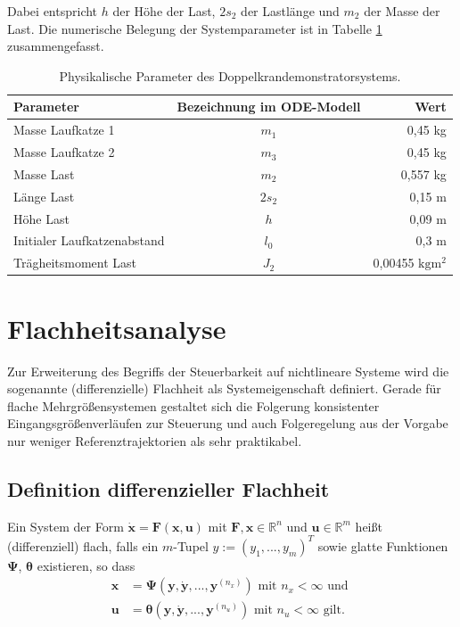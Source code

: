Dabei entspricht $h$ der Höhe der Last, $2 s_2$ der Lastlänge und $m_2$ der Masse der Last. Die numerische Belegung der Systemparameter ist in Tabelle \ref{tab:sys_params} zusammengefasst.

\begin{table}[htbp]%
	\centering
	\caption{Physikalische Parameter des Doppelkrandemonstratorsystems.}
	\label{tab:sys_params}
	\begin{tabular}{l c r} 
		\toprule
		Parameter & Bezeichnung im ODE-Modell & Wert \\ 
		\hline
		Masse Laufkatze 1 & $m_1$ & 0,45 \si{\kg} \\
		Masse Laufkatze 2 & $m_3$ & 0,45 \si{\kg} \\
 		Masse Last & $m_2$ & 0,557 \si{\kg} \\
		Länge Last & $2 s_2$ & 0,15 \si{\m} \\
		Höhe Last & $h$ & 0,09 \si{\m} \\
		Initialer Laufkatzenabstand & $l_0$ & 0,3 \si{\m} \\
		Trägheitsmoment Last & $J_2$ & 0,00455 $\si{\kg\m^2}$ \\
		\bottomrule
	\end{tabular}
\end{table}

\chapter{Flachheitsanalyse}
Zur Erweiterung des Begriffs der Steuerbarkeit auf nichtlineare Systeme wird die sogenannte (differenzielle) Flachheit als Systemeigenschaft definiert. Gerade für flache Mehrgrößensystemen gestaltet sich die Folgerung konsistenter Eingangsgrößenverläufen zur Steuerung und auch Folgeregelung aus der Vorgabe nur weniger Referenztrajektorien als sehr praktikabel.

\section{Definition differenzieller Flachheit}\label{sec:Def_flatness}

Ein System der Form $\dot{\mathbf{x}} = \mathbf{F}(\mathbf{x}, \mathbf{u})$ mit $\mathbf{F}, \mathbf{x} \in \mathbb{R}^n$ und $\mathbf{u} \in \mathbb{R}^m$ heißt (differenziell) flach, falls ein $m$-Tupel $y := (y_1, ..., y_m)^T$ sowie glatte Funktionen $\mathbf{\Psi}$, $\boldsymbol{\theta}$ existieren, so dass
\begin{subequations}
\label{eq:general_flat_sys}
\begin{align}
\mathbf{x} &= \mathbf{\Psi}(\mathbf{y}, \dot{\mathbf{y}}, ..., \mathbf{y}^{(n_x)}) \text{ mit } n_x < \infty \text{ und } \\
\mathbf{u} &= \boldsymbol{\theta}(\mathbf{y}, \dot{\mathbf{y}}, ..., \mathbf{y}^{(n_u)}) \text{ mit } n_u < \infty \text{ gilt.}
\end{align}
\end{subequations}


